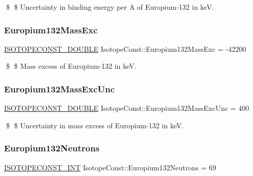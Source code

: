 \$ \$ Uncertainty in binding energy per A of Europium-\/132 in keV. \mbox{\label{group___isotope_const-_europium-_eu132_ga1b6b267d8acb07f59350214c3bfe9e0d}} 
\subsubsection{\texorpdfstring{Europium132\+Mass\+Exc}{Europium132MassExc}}
{\footnotesize\ttfamily \mbox{\hyperlink{group___isotope_const-_macros_ga8f45a7272ce02c0b4c65c44636ed719a}{I\+S\+O\+T\+O\+P\+E\+C\+O\+N\+S\+T\+\_\+\+D\+O\+U\+B\+LE}} Isotope\+Const\+::\+Europium132\+Mass\+Exc = -\/42200}

\$ \$ Mass excess of Europium-\/132 in keV. \mbox{\label{group___isotope_const-_europium-_eu132_ga1cb0501d97e0b83ffa04f7bf4c60bbe0}} 
\subsubsection{\texorpdfstring{Europium132\+Mass\+Exc\+Unc}{Europium132MassExcUnc}}
{\footnotesize\ttfamily \mbox{\hyperlink{group___isotope_const-_macros_ga8f45a7272ce02c0b4c65c44636ed719a}{I\+S\+O\+T\+O\+P\+E\+C\+O\+N\+S\+T\+\_\+\+D\+O\+U\+B\+LE}} Isotope\+Const\+::\+Europium132\+Mass\+Exc\+Unc = 400}

\$ \$ Uncertainty in mass excess of Europium-\/132 in keV. \mbox{\label{group___isotope_const-_europium-_eu132_ga6179a5b6e7acc6e53e65d77ae025f27c}} 
\subsubsection{\texorpdfstring{Europium132\+Neutrons}{Europium132Neutrons}}
{\footnotesize\ttfamily \mbox{\hyperlink{group___isotope_const-_macros_ga5f18360b3e99483a35c32d789e62621c}{I\+S\+O\+T\+O\+P\+E\+C\+O\+N\+S\+T\+\_\+\+I\+NT}} Isotope\+Const\+::\+Europium132\+Neutrons = 69}

